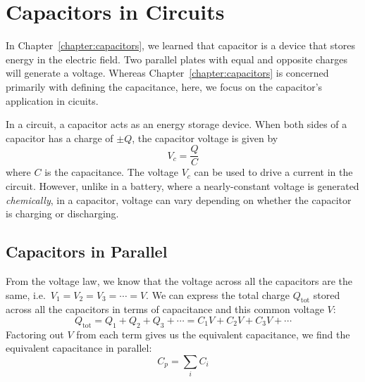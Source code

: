 \section{Capacitors in Circuits}

In Chapter~\ref{chapter:capacitors}, we learned that capacitor is a device that
stores energy in the electric field. Two parallel plates with equal and opposite
charges will generate a voltage. Whereas Chapter~\ref{chapter:capacitors} is
concerned primarily with defining the capacitance, here, we focus on the
capacitor's application in cicuits.

In a circuit, a capacitor acts as an energy storage device. When both sides of
a capacitor has a charge of $\pm Q$, the capacitor voltage is given by
\begin{equation*}
  V_c=\frac QC
\end{equation*}
where $C$ is the capacitance. The voltage $V_c$ can be used to drive a current
in the circuit. However, unlike in a battery, where a nearly-constant voltage is
generated \emph{chemically}, in a capacitor, voltage can vary depending on
whether the capacitor is charging or discharging.

\subsection{Capacitors in Parallel}

\begin{figure}[ht]
  \centering
\end{figure}
From the voltage law, we know that the voltage across all the capacitors are
the same, i.e.\ $V_1=V_2=V_3=\cdots=V$. We can express the total charge
$Q_\text{tot}$ stored across all the capacitors in terms of capacitance and this
common voltage $V$: 
\begin{equation}
  Q_\text{tot}=Q_1+Q_2+Q_3+\cdots=C_1V+C_2V+C_3V+\cdots
\end{equation}  
Factoring out $V$ from each term gives us the equivalent capacitance, we find
the equivalent capacitance in parallel:
\begin{equation}
  \boxed{
    C_p=\sum_i C_i
  }
\end{equation}


